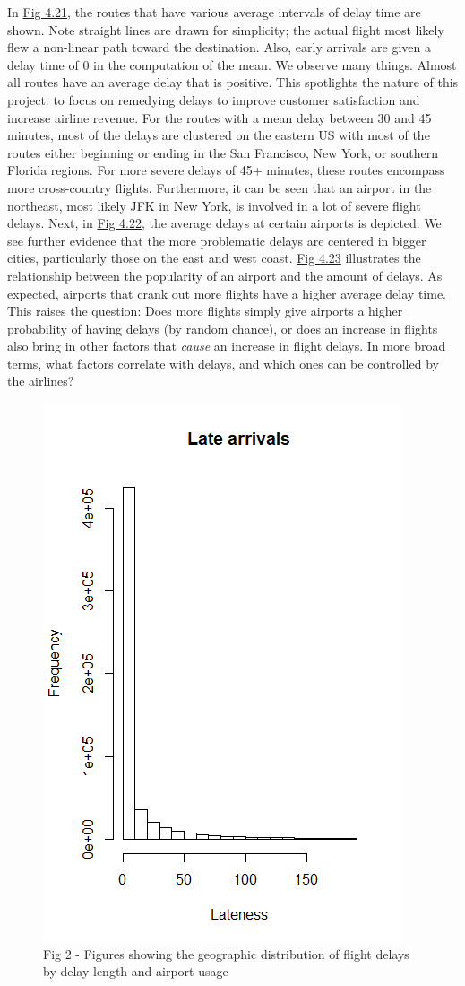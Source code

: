 \documentclass[12pt, a4paper]{book}
\newcommand\tab[1][1cm]{\hspace*{#1}}
\begin{document}
			\tab In \underline{Fig 4.21}, the routes that have various average intervals of delay time are shown. Note straight lines are drawn for simplicity; the actual flight most likely flew a non-linear path toward the destination. Also, early arrivals are given a delay time of 0 in the computation of the mean. We observe many things. Almost all routes have an average delay that is positive. This spotlights the nature of this project: to focus on remedying delays to improve customer satisfaction and increase airline revenue. For the routes with a mean delay between 30 and 45 minutes, most of the delays are clustered on the eastern US with most of the routes either beginning or ending in the San Francisco, New York, or southern Florida regions. For more severe delays of 45+ minutes, these routes encompass more cross-country flights. Furthermore, it can be seen that an airport in the northeast, most likely JFK in New York, is involved in a lot of severe flight delays. Next, in \underline{Fig 4.22}, the average delays at certain airports is depicted. We see further evidence that the more problematic delays are centered in bigger cities, particularly those on the east and west coast. \underline{Fig 4.23} illustrates the relationship between the popularity of an airport and the amount of delays. As expected, airports that crank out more flights have a higher average delay time. This raises the question: Does more flights simply give airports a higher probability of having delays (by random chance), or does an increase in flights also bring in other factors that \textit{cause} an increase in flight delays. In more broad terms, what factors correlate with delays, and which ones can be controlled by the airlines?\\
			\begin{figure}
			\centering
	 		\includegraphics[width = .45 \textwidth]{../figures/LateArrivalsHistogram}
	 		\caption{Fig 2 - Figures showing the geographic distribution of flight delays by delay length and airport usage}
	 		\end{figure}
	 		
\end{document}
